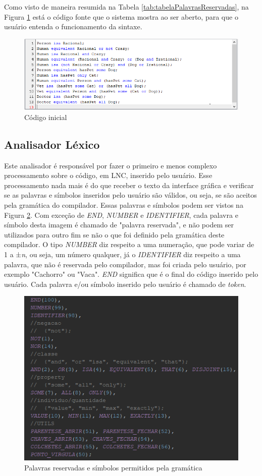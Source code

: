 \documentclass{bcc}
\begin{document}
Como visto de maneira resumida na Tabela \ref{tab:tabelaPalavrasReservadas}, na Figura \ref{fig:codigoFonteInicial} está o código fonte que o sistema mostra ao ser aberto, para que o usuário entenda o funcionamento da sintaxe.

\begin{figure}[H]
\centering
\includegraphics[width=.8\textwidth]{Figuras/codigo_codigofonte_inicial.png}
\caption{Código inicial}
\label{fig:codigoFonteInicial}
\end{figure}

\subsection{Analisador Léxico}

Este analisador é responsável por fazer o primeiro e menos complexo processamento sobre o código, em LNC, inserido pelo usuário. Esse processamento nada mais é do que receber o texto da interface gráfica e verificar se as palavras e símbolos inseridos pelo usuário são válidos, ou seja, se são aceitos pela gramática do compilador. Essas palavras e símbolos podem ser vistos na Figura \ref{fig:codigoTokenenum}. Com exceção de \textit{END}, \textit{NUMBER} e \textit{IDENTIFIER}, cada palavra e símbolo desta imagem é chamado de "palavra reservada", e não podem ser utilizados para outro fim se não o que foi definido pela gramática deste compilador. O tipo \textit{NUMBER} diz respeito a uma numeração, que pode variar de 1 a ±\textit{n}, ou seja, um número qualquer, já o \textit{IDENTIFIER} diz respeito a uma palavra, que não é reservada pelo compilador, mas foi criada pelo usuário, por exemplo "Cachorro" ou "Vaca". \textit{END} significa que é o final do código inserido pelo usuário. Cada palavra e/ou símbolo inserido pelo usuário é chamado de \textit{token}.

\begin{figure}[H]
\centering
\includegraphics[width=.6\textwidth]{Figuras/codigo_tokenenum.png}
\caption{Palavras reservadas e símbolos permitidos pela gramática}
\label{fig:codigoTokenenum}
\end{figure}
\end{document}
